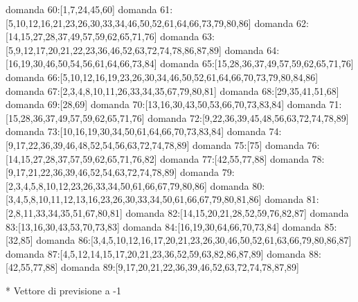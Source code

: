 domanda 60:[1,7,24,45,60]
domanda 61:[5,10,12,16,21,23,26,30,33,34,46,50,52,61,64,66,73,79,80,86]
domanda 62:[14,15,27,28,37,49,57,59,62,65,71,76]
domanda 63:[5,9,12,17,20,21,22,23,36,46,52,63,72,74,78,86,87,89]
domanda 64:[16,19,30,46,50,54,56,61,64,66,73,84]
domanda 65:[15,28,36,37,49,57,59,62,65,71,76]
domanda 66:[5,10,12,16,19,23,26,30,34,46,50,52,61,64,66,70,73,79,80,84,86]
domanda 67:[2,3,4,8,10,11,26,33,34,35,67,79,80,81]
domanda 68:[29,35,41,51,68]
domanda 69:[28,69]
domanda 70:[13,16,30,43,50,53,66,70,73,83,84]
domanda 71:[15,28,36,37,49,57,59,62,65,71,76]
domanda 72:[9,22,36,39,45,48,56,63,72,74,78,89]
domanda 73:[10,16,19,30,34,50,61,64,66,70,73,83,84]
domanda 74:[9,17,22,36,39,46,48,52,54,56,63,72,74,78,89]
domanda 75:[75]
domanda 76:[14,15,27,28,37,57,59,62,65,71,76,82]
domanda 77:[42,55,77,88]
domanda 78:[9,17,21,22,36,39,46,52,54,63,72,74,78,89]
domanda 79:[2,3,4,5,8,10,12,23,26,33,34,50,61,66,67,79,80,86]
domanda 80:[3,4,5,8,10,11,12,13,16,23,26,30,33,34,50,61,66,67,79,80,81,86]
domanda 81:[2,8,11,33,34,35,51,67,80,81]
domanda 82:[14,15,20,21,28,52,59,76,82,87]
domanda 83:[13,16,30,43,53,70,73,83]
domanda 84:[16,19,30,64,66,70,73,84]
domanda 85:[32,85]
domanda 86:[3,4,5,10,12,16,17,20,21,23,26,30,46,50,52,61,63,66,79,80,86,87]
domanda 87:[4,5,12,14,15,17,20,21,23,36,52,59,63,82,86,87,89]
domanda 88:[42,55,77,88]
domanda 89:[9,17,20,21,22,36,39,46,52,63,72,74,78,87,89]


* Vettore di previsione a -1

